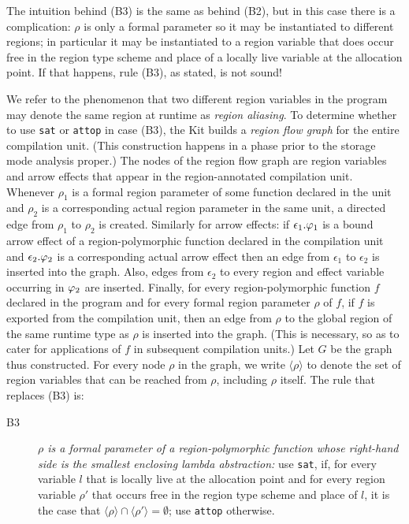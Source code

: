\documentclass[12pt]{book}
\begin{document}
The intuition behind (B3) is the same as behind (B2), but
in this case there is a complication: 
$\rho$ is only a formal parameter so it may
be instantiated to different regions; 
in particular it may be instantiated to 
a region variable that does occur free in the region type scheme and place of a
locally live variable at the allocation point. If that happens, 
rule (B3), as stated, is not sound!

We refer to the phenomenon that two different region variables in the
program may denote the same region at runtime as 
%
{\em region aliasing}. To determine whether to use {\tt sat}
or {\tt attop} in case (B3), the Kit builds a \label{region flow graph}{\em region flow graph\/} for the
entire compilation unit. (This construction happens in a phase prior to the storage
mode analysis proper.)  The nodes of the region flow graph are region
variables and arrow effects that appear in the region-annotated
compilation unit.  Whenever $\rho_1$ is a formal region parameter of
some function declared in the unit and $\rho_2$ is a corresponding
actual region parameter in the same unit, a directed edge from
$\rho_1$ to $\rho_2$ is created. Similarly for arrow effects: if
$\epsilon_1.\varphi_1$ is a bound arrow effect of a region-polymorphic
function declared in the compilation unit and $\epsilon_2.\varphi_2$ is a
corresponding actual arrow effect then an edge from $\epsilon_1$ to
$\epsilon_2$ is inserted into the graph.  Also, edges from
$\epsilon_2$ to every region and effect variable occurring in $\varphi_2$
are inserted. Finally, for every region-polymorphic function $f$
declared in the program and for every formal region parameter $\rho$ of
$f$, if $f$ is exported from the compilation unit, then an edge from
$\rho$ to the global region of the same runtime type as $\rho$ is
inserted into the graph. (This is necessary, so as to cater for
applications of $f$ in subsequent compilation units.)  Let $G$ be
the graph thus constructed. For every node $\rho$ in the graph, we
write $\langle\rho\rangle$ to denote the set of region variables that
can be reached from $\rho$, including $\rho$ itself. The rule that
replaces (B3) is:
\begin{description}
\item[B3]{\it $\rho$ is a formal parameter of a region-polymorphic function
      whose right-hand side is the smallest enclosing lambda abstraction:}
      use {\tt sat}, if, for every variable $l$ that is locally live 
      at the allocation point and for every region variable $\rho'$
      that occurs free in the region type scheme and place of $l$, it
      is the case that $\langle\rho\rangle\cap\langle\rho'\rangle =\emptyset$;
      use {\tt attop} otherwise.
\end{description}
\medskip
\end{document}
